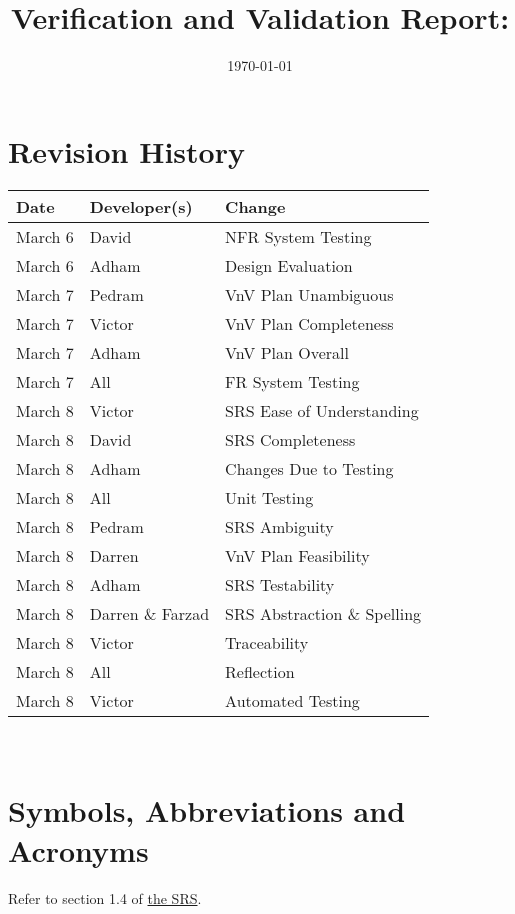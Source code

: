 \documentclass[12pt, titlepage]{article}
\begin{document}
\title{Verification and Validation Report: \progname} 
\author{\authname}
\date{\today}
	
\maketitle


\section{Revision History}

\begin{tabularx}{\textwidth}{p{2cm}p{3.5cm}X}
\toprule {\bf Date} & {\bf Developer(s)} & {\bf Change}\\
\midrule
March 6 & David & NFR System Testing\\
March 6 & Adham & Design Evaluation\\
March 7 & Pedram & VnV Plan Unambiguous\\
March 7 & Victor & VnV Plan Completeness\\
March 7 & Adham & VnV Plan Overall\\
March 7 & All & FR System Testing\\
March 8 & Victor & SRS Ease of Understanding\\
March 8 & David & SRS Completeness\\
March 8 & Adham & Changes Due to Testing\\
March 8 & All & Unit Testing\\
March 8 & Pedram & SRS Ambiguity\\
March 8 & Darren & VnV Plan Feasibility\\
March 8 & Adham & SRS Testability\\
March 8 & Darren \& Farzad & SRS Abstraction \& Spelling\\
March 8 & Victor & Traceability\\
March 8 & All & Reflection\\
March 8 & Victor & Automated Testing\\
\bottomrule
\end{tabularx}

~\newpage

\section{Symbols, Abbreviations and Acronyms}

Refer to section 1.4 of \href{https://github.com/agentvv/MTOBridge/blob/main/docs/SRS/SRS.pdf}{the SRS}.
\end{document}
